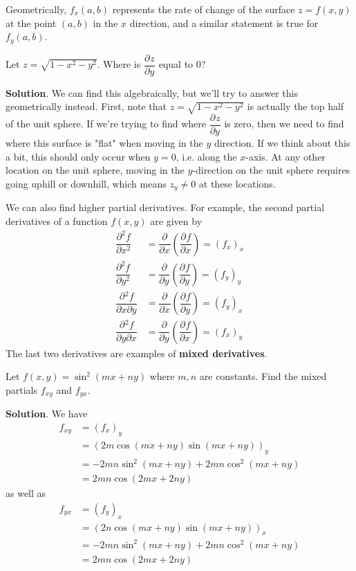 \documentclass[10pt,]{book}
\newcommand{\terminology}[1]{\textbf{#1}}
\theoremstyle{ptxplainnotitle}
\theoremstyle{ptxplaintitle}
\theoremstyle{ptxplainnotitle}
\theoremstyle{ptxplaintitle}
\theoremstyle{ptxplainnotitle}
\theoremstyle{ptxplaintitle}
\theoremstyle{ptxdefinitionnotitle}
\theoremstyle{ptxdefinitiontitle}
\theoremstyle{ptxdefinitionnotitle}
\theoremstyle{ptxdefinitiontitle}
\theoremstyle{ptxdefinitionnotitle}
\theoremstyle{ptxdefinitiontitle}
\theoremstyle{ptxdefinitionnotitle}
\theoremstyle{ptxdefinitiontitle}
\theoremstyle{ptxdefinitionnotitle}
\theoremstyle{ptxdefinitiontitle}
\numberwithin{equation}{section}
\newcommand{\pdv}[3][]{\dfrac{\partial^{#1} #2}{\partial #3^{#1}}}
\begin{document}
\hypertarget{p-1015}{}%
Geometrically, \(f_{x}(a,b)\) represents the rate of change of the surface \(z = f(x,y)\) at the point \((a,b)\) in the \(x\) direction, and a similar statement is true for \(f_{y}(a,b)\).%
\begin{example}\label{example-partial-derivatives-on-the-unit-sphere}
\hypertarget{p-1016}{}%
Let \(z = \sqrt{1-x^{2} - y^{2}}\). Where is \(\pdv{z}{y}\) equal to \(0\)?%
\par\smallskip%
\noindent\textbf{Solution}.\hypertarget{solution-156}{}\quad%
\hypertarget{p-1017}{}%
We can find this algebraically, but we'll try to answer this geometrically instead. First, note that \(z = \sqrt{1 - x^{2} - y^{2}}\) is actually the top half of the unit sphere. If we're trying to find where \(\pdv{z}{y}\) is zero, then we need to find where this surface is "flat" when moving in the \(y\) direction. If we think about this a bit, this should only occur when \(y=0\), i.e. along the \(x\)-axis. At any other location on the unit sphere, moving in the \(y\)-direction on the unit sphere requires going uphill or downhill, which means \(z_{y}\neq0\) at these locations.%
\end{example}
\hypertarget{p-1018}{}%
We can also find higher partial derivatives. For example, the second partial derivatives of a function \(f(x,y)\) are given by%
\begin{align*}
\pdv[2]{f}{x} & = \pdv{}{x}\left(\pdv{f}{x}\right) = (f_{x})_{x} \\
\pdv[2]{f}{y} & = \pdv{}{y}\left(\pdv{f}{y}\right) = (f_{y})_{y} \\
\pdv{{}^{2}f}{x\partial y} & = \pdv{}{x}\left(\pdv{f}{y}\right) = (f_{y})_{x} \\
\pdv{{}^{2}f}{y\partial x} & = \pdv{}{y}\left(\pdv{f}{x}\right) = (f_{x})_{y} 
\end{align*}
The last two derivatives are examples of \terminology{mixed derivatives}.%
\begin{example}\label{example-mixed-partials}
\hypertarget{p-1019}{}%
Let \(f(x,y) = \sin^{2}(mx+ny)\) where \(m,n\) are constants. Find the mixed partials \(f_{xy}\) and \(f_{yx}\).%
\par\smallskip%
\noindent\textbf{Solution}.\hypertarget{solution-157}{}\quad%
\hypertarget{p-1020}{}%
We have%
\begin{align*}
f_{xy} & = (f_{x})_{y} \\
& = (2m\cos(mx+ny)\sin(mx+ny))_{y} \\
& = -2mn\sin^{2}(mx+ny) + 2mn\cos^{2}(mx+ny) \\
& = 2mn\cos(2mx+2ny) 
\end{align*}
as well as%
\begin{align*}
f_{yx} & = (f_{y})_{x} \\
& = (2n\cos(mx+ny)\sin(mx+ny))_{x} \\
& = -2mn\sin^{2}(mx+ny) + 2mn\cos^{2}(mx+ny) \\
& = 2mn\cos(2mx+2ny) 
\end{align*}
%
\end{example}
\end{document}
